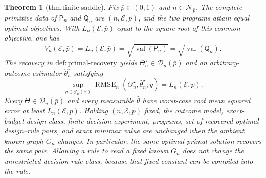 \documentclass{article}
\newtheorem{theorem}{Theorem}
\begin{document}
\begin{theorem}[thm:finite-saddle]\label{thm:finite-saddle}
Fix \(\bar p\in(0,1)\) and \(n\in\mathcal N_{\bar p}\). The complete primitive data of \(\mathsf P_n\) and \(\mathsf Q_n\) are \((n,\mathcal E,\bar p)\), and the two programs attain equal optimal objectives. With \(L_n(\mathcal E,\bar p)\) equal to the square root of this common objective, one has
\[
 V_n^\star(\mathcal E,\bar p)=L_n(\mathcal E,\bar p)
 =\sqrt{\operatorname{val}(\mathsf P_n)}
 =\sqrt{\operatorname{val}(\mathsf Q_n)}.
\]
The recovery in \(\mathrm{def{:}primal\text{-}recovery}\) yields \(\Theta_n^\star\in\mathcal D_n(\bar p)\) and an arbitrary-outcome estimator \(\widehat\theta_n^\star\) satisfying
\[
 \sup_{y\in\mathcal Y_n(\mathcal E)}
 \operatorname{RMSE}_n(\Theta_n^\star,\widehat\theta_n^\star;y)
 =L_n(\mathcal E,\bar p).
\]
Every \(\Theta\in\mathcal D_n(\bar p)\) and every measurable \(\widehat\theta\) have worst-case root mean squared error at least \(L_n(\mathcal E,\bar p)\). Holding \((n,\mathcal E,\bar p)\) fixed, the outcome model, exact-budget design class, finite decision experiment, programs, set of recovered optimal design--rule pairs, and exact minimax value are unchanged when the ambient known graph \(G_n\) changes. In particular, the same optimal primal solution recovers the same pair. Allowing a rule to read a fixed known \(G_n\) does not change the unrestricted decision-rule class, because that fixed constant can be compiled into the rule.
\end{theorem}
\end{document}
